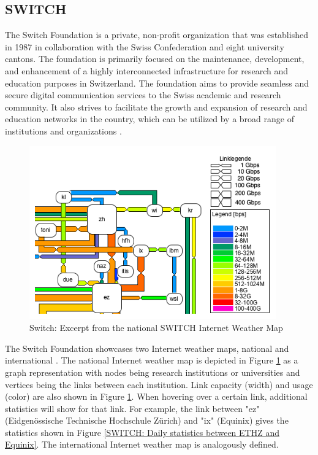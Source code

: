 \documentclass[sigconf,authorversion,nonacm]{acmart}
\begin{document}
\subsection{SWITCH}

The Switch Foundation is a private, non-profit organization that was established in 1987 in collaboration with the Swiss Confederation and eight university cantons. The foundation is primarily focused on the maintenance, development, and enhancement of a highly interconnected infrastructure for research and education purposes in Switzerland. The foundation aims to provide seamless and secure digital communication services to the Swiss academic and research community. It also strives to facilitate the growth and expansion of research and education networks in the country, which can be utilized by a broad range of institutions and organizations \cite{switch}.

\begin{figure}
    \centering
    \includegraphics[width=\linewidth]{SWITCH/switch.PNG}
    \caption{Switch: Excerpt from the national SWITCH Internet Weather Map}
    \label{SWITCH: National SWITCH Internet Weather Map}
\end{figure}

The Switch Foundation showcases two Internet weather maps, national \cite{switchnational} and international \cite{switchinternational}. The national Internet weather map is depicted in Figure \ref{SWITCH: National SWITCH Internet Weather Map} as a graph representation with nodes being research institutions or universities and vertices being the links between each institution. Link capacity (width) and usage (color) are also shown in Figure \ref{SWITCH: National SWITCH Internet Weather Map}. When hovering over a certain link, additional statistics will show for that link. For example, the link between "ez" (Eidgenössische Technische Hochschule Zürich) and "ix" (Equinix) gives the statistics shown in Figure \ref{SWITCH: Daily statistics between ETHZ and Equinix}. The international Internet weather map is analogously defined.
\end{document}
